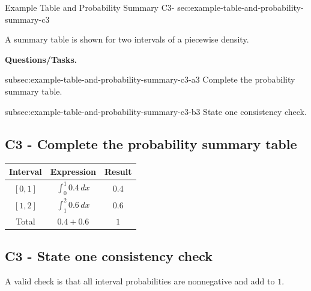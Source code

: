 	\sectionScored
	{Example Table and Probability Summary}
	{C3-}
	{sec:example-table-and-probability-summary-c3}
	{
	A summary table is shown for two intervals of a piecewise density.
	
	\textbf{Questions/Tasks.}
	\begin{enumerate}
		\CriterionTask
		{subsec:example-table-and-probability-summary-c3-a}{3}
		{Complete the probability summary table. }
		
		\CriterionTask
		{subsec:example-table-and-probability-summary-c3-b}{3}
		{State one consistency check. }
	\end{enumerate}
	
	\label{subsec:example-table-and-probability-summary-c3-a}
	\subsection*{C3 - Complete the probability summary table }
	
	\begin{minipage}[t]{0.42\textwidth}
		\vspace{0pt}
		\centering
	\end{minipage}
	\hfill
	\begin{minipage}[t]{0.54\textwidth}
		\vspace{0pt}
		\centering
		
		\begin{tabular}{|c|c|c|}
			\hline
			Interval & Expression & Result \\
			\hline
			$[0,1]$ & $\int_0^1 0.4\,dx$ & $0.4$ \\
			$[1,2]$ & $\int_1^2 0.6\,dx$ & $0.6$ \\
			\hline
			Total & $0.4+0.6$ & $1$ \\
			\hline
		\end{tabular}
		
	\end{minipage}
	
	\vspace{-5mm}
	
	\label{subsec:example-table-and-probability-summary-c3-b}
	\subsection*{C3 - State one consistency check }
	
	A valid check is that all interval probabilities are nonnegative and add to $1$.
	
	}
	




